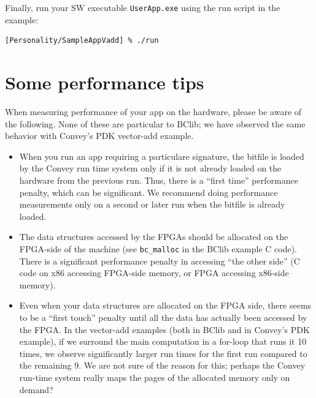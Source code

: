 \documentclass[twoside,letterpaper,11pt]{article}
\begin{document}
Finally, run your SW executable \verb|UserApp.exe| using the run
script in the example:

\begin{Verbatim}[frame=single, label=Convey PDK sim run]
[Personality/SampleAppVadd] % ./run
\end{Verbatim}


\section{Some performance tips}

\label{sec_performance_tips}

When measuring performance of your app on the hardware, please be
aware of the following.  None of these are particular to BClib; we
have observed the same behavior with Convey's PDK vector-add example.

\begin{itemize}

\item When you run an app requiring a particulare signature, the
bitfile is loaded by the Convey run time system only if it is not
already loaded on the hardware from the previous run.  Thus, there is
a ``first time'' performance penalty, which can be significant.  We
recommend doing performance measurements only on a second or later run
when the bitfile is already loaded.

\item The data structures accessed by the FPGAs should be allocated on
the FPGA-side of the machine (see \verb|bc_malloc| in the BClib
example C code).  There is a significant performance penalty in
accessing ``the other side'' (C code on x86 accessing FPGA-side
memory, or FPGA accessing x86-side memory).

\item Even when your data structures are allocated on the FPGA side,
there seems to be a ``first touch'' penalty until all the data has
actually been accessed by the FPGA.  In the vector-add examples (both
in BClib and in Convey's PDK example), if we surround the main
computation in a for-loop that runs it 10 times, we observe
significantly larger run times for the first run compared to the
remaining 9.  We are not sure of the reason for this; perhaps the
Convey run-time system really maps the pages of the allocated memory
only on demand?

\end{itemize}
\end{document}
